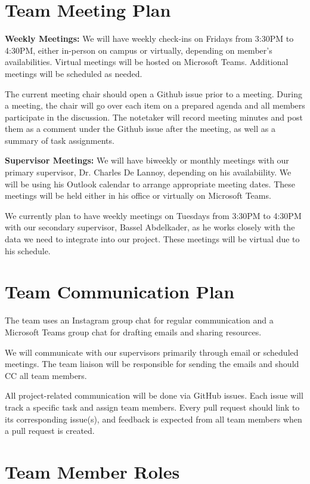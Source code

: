 \documentclass{article}
\begin{document}
\section{Team Meeting Plan}
\noindent \textbf{Weekly Meetings:}
We will have weekly check-ins on Fridays from 3:30PM to 4:30PM, either in-person 
on campus or virtually, depending on member's availabilities. Virtual meetings 
will be hosted on Microsoft Teams. Additional meetings will be scheduled as needed.

The current meeting chair should open a Github issue prior to a meeting. During a 
meeting, the chair will go over each item on a prepared agenda and all members 
participate in the discussion. The notetaker will record meeting minutes and post 
them as a comment under the Github issue after the meeting, as well as a summary of
task assignments.

\noindent \textbf{Supervisor Meetings:}
We will have biweekly or monthly meetings with our primary supervisor, Dr. Charles
De Lannoy, depending on his availabiility. We will be using his Outlook calendar to
arrange appropriate meeting dates. These meetings will be held either in his
office or virtually on Microsoft Teams.

We currently plan to have weekly meetings on Tuesdays from 3:30PM to 4:30PM with
our secondary supervisor, Bassel Abdelkader, as he works closely with the data 
we need to integrate into our project. These meetings will be virtual due
to his schedule.

\section{Team Communication Plan}

The team uses an Instagram group chat for regular communication and a Microsoft Teams 
group chat for drafting emails and sharing resources.

We will communicate with our supervisors primarily through email or scheduled meetings.
The team liaison will be responsible for sending the emails and should CC all team
members.

All project-related communication will be done via GitHub issues. Each issue will track
a specific task and assign team members. Every pull request should link to its 
corresponding issue(s), and feedback is expected from all team members when a pull request 
is created.

\section{Team Member Roles}
\end{document}
